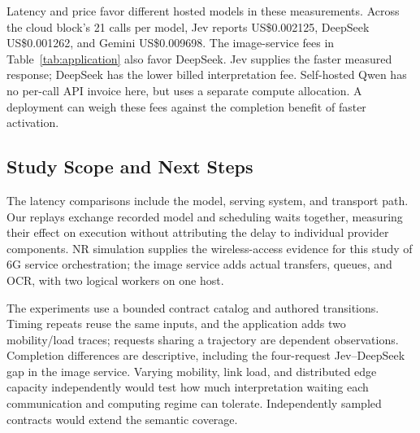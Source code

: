 Latency and price favor different hosted models in these measurements. Across the cloud block's 21 calls per model, Jev reports US\$0.002125, DeepSeek US\$0.001262, and Gemini US\$0.009698. The image-service fees in Table~\ref{tab:application} also favor DeepSeek. Jev supplies the faster measured response; DeepSeek has the lower billed interpretation fee. Self-hosted Qwen has no per-call API invoice here, but uses a separate compute allocation. A deployment can weigh these fees against the completion benefit of faster activation.

\subsection{Study Scope and Next Steps}
The latency comparisons include the model, serving system, and transport path. Our replays exchange recorded model and scheduling waits together, measuring their effect on execution without attributing the delay to individual provider components. NR simulation supplies the wireless-access evidence for this study of 6G service orchestration; the image service adds actual transfers, queues, and OCR, with two logical workers on one host.

The experiments use a bounded contract catalog and authored transitions. Timing repeats reuse the same inputs, and the application adds two mobility/load traces; requests sharing a trajectory are dependent observations. Completion differences are descriptive, including the four-request Jev--DeepSeek gap in the image service. Varying mobility, link load, and distributed edge capacity independently would test how much interpretation waiting each communication and computing regime can tolerate. Independently sampled contracts would extend the semantic coverage.
